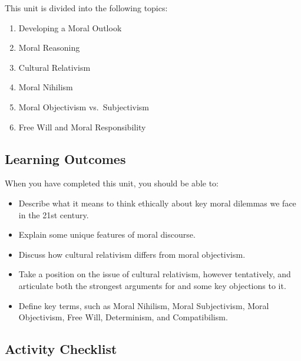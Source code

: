 \documentclass[
]{book}
\providecommand{\tightlist}{%
  \setlength{\itemsep}{0pt}\setlength{\parskip}{0pt}}
\begin{document}
This unit is divided into the following topics:

\begin{enumerate}
\def\labelenumi{\arabic{enumi}.}
\tightlist
\item
  Developing a Moral Outlook\\
\item
  Moral Reasoning\\
\item
  Cultural Relativism\\
\item
  Moral Nihilism\\
\item
  Moral Objectivism vs.~Subjectivism\\
\item
  Free Will and Moral Responsibility
\end{enumerate}

\hypertarget{learning-outcomes}{%
\subsection*{Learning Outcomes}\label{learning-outcomes}}

When you have completed this unit, you should be able to:

\begin{itemize}
\tightlist
\item
  Describe what it means to think ethically about key moral dilemmas we face in the 21st century.
\item
  Explain some unique features of moral discourse.
\item
  Discuss how cultural relativism differs from moral objectivism.
\item
  Take a position on the issue of cultural relativism, however tentatively, and articulate both the strongest arguments for and some key objections to it.
\item
  Define key terms, such as Moral Nihilism, Moral Subjectivism, Moral Objectivism, Free Will, Determinism, and Compatibilism.
\end{itemize}

\hypertarget{activity-checklist}{%
\subsection*{Activity Checklist}\label{activity-checklist}}
\end{document}
